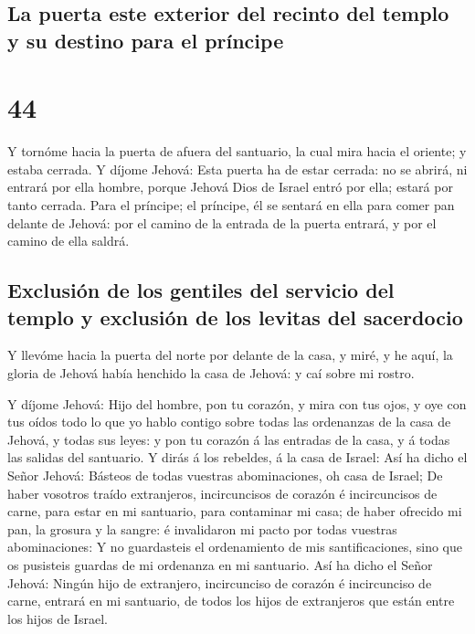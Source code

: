 \hypertarget{la-puerta-este-exterior-del-recinto-del-templo-y-su-destino-para-el-pruxedncipe}{%
\subsection{La puerta este exterior del recinto del templo y su destino
para el
príncipe}\label{la-puerta-este-exterior-del-recinto-del-templo-y-su-destino-para-el-pruxedncipe}}

\hypertarget{section-26-44}{%
\section{44}\label{section-26-44}}

 Y tornóme hacia la puerta de afuera del santuario, la
cual mira hacia el oriente; y estaba cerrada.  Y díjome
Jehová: Esta puerta ha de estar cerrada: no se abrirá, ni entrará por
ella hombre, porque Jehová Dios de Israel entró por ella; estará por
tanto cerrada.  Para el príncipe; el príncipe, él se
sentará en ella para comer pan delante de Jehová: por el camino de la
entrada de la puerta entrará, y por el camino de ella saldrá.

\hypertarget{exclusiuxf3n-de-los-gentiles-del-servicio-del-templo-y-exclusiuxf3n-de-los-levitas-del-sacerdocio}{%
\subsection{Exclusión de los gentiles del servicio del templo y
exclusión de los levitas del
sacerdocio}\label{exclusiuxf3n-de-los-gentiles-del-servicio-del-templo-y-exclusiuxf3n-de-los-levitas-del-sacerdocio}}

 Y llevóme hacia la puerta del norte por delante de la
casa, y miré, y he aquí, la gloria de Jehová había henchido la casa de
Jehová: y caí sobre mi rostro.

 Y díjome Jehová: Hijo del hombre, pon tu corazón, y mira
con tus ojos, y oye con tus oídos todo lo que yo hablo contigo sobre
todas las ordenanzas de la casa de Jehová, y todas sus leyes: y pon tu
corazón á las entradas de la casa, y á todas las salidas del santuario.
 Y dirás á los rebeldes, á la casa de Israel: Así ha dicho
el Señor Jehová: Básteos de todas vuestras abominaciones, oh casa de
Israel;  De haber vosotros traído extranjeros,
incircuncisos de corazón é incircuncisos de carne, para estar en mi
santuario, para contaminar mi casa; de haber ofrecido mi pan, la grosura
y la sangre: é invalidaron mi pacto por todas vuestras abominaciones:
 Y no guardasteis el ordenamiento de mis santificaciones,
sino que os pusisteis guardas de mi ordenanza en mi santuario.
 Así ha dicho el Señor Jehová: Ningún hijo de extranjero,
incircunciso de corazón é incircunciso de carne, entrará en mi
santuario, de todos los hijos de extranjeros que están entre los hijos
de Israel.

